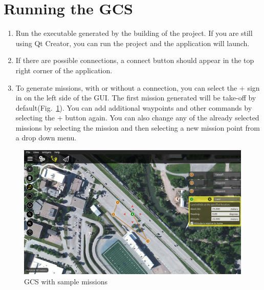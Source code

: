 \documentclass[10pt,a4paper,notitlepage]{report}
\begin{document}
\section*{Running the GCS}
\begin{enumerate}
\item Run the executable generated by the building of the project. If you are still using Qt Creator, you can run the project and the application will launch.
\item If there are possible connections, a connect button should appear in the top right corner of the application.
\item To generate missions, with or without a connection, you can select the + sign in on the left side of the GUI. The first mission generated will be take-off by default(Fig.~\ref{fig:mission}). You can add additional waypoints and other commands by selecting the + button again. You can also change any of the already selected missions by selecting the mission and then selecting a new mission point from a drop down menu. 
\end{enumerate}


\begin{figure}[h]
\includegraphics[scale=.35]{mission.png}
\caption{GCS with sample missions}
\label{fig:mission}
\end{figure}
\end{document}

